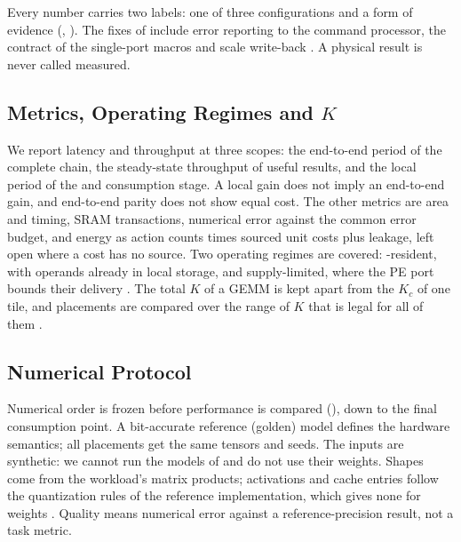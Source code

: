 %
Every number carries two labels: one of three configurations  and a form of evidence (, ).
The fixes of \cfgCorrected include error reporting to the command processor, the contract of the single-port \Lii macros and scale write-back .
A physical result is never called measured.

\subsection{Metrics, Operating Regimes and \texorpdfstring{$K$}{K}}\label{sec:metrics}

%
We report latency and throughput at three scopes: the end-to-end period of the complete chain, the steady-state throughput of useful results, and the local period of the \handoff and consumption stage.
A local gain does not imply an end-to-end gain, and end-to-end parity does not show equal \handoff cost.
The other metrics are area and timing, SRAM transactions, numerical error against the common error budget, and energy as action counts times sourced unit costs plus leakage, left open where a cost has no source.
Two operating regimes are covered: \Lii-resident, with operands already in local storage, and supply-limited, where the PE port bounds their delivery .
The total $K$ of a GEMM is kept apart from the $K_c$ of one tile, and placements are compared over the range of $K$ that is legal for all of them .

\subsection{Numerical Protocol}\label{sec:numerics}

%
Numerical order is frozen before performance is compared (), down to the final consumption point.
A bit-accurate reference (golden) model defines the hardware semantics; all placements get the same tensors and seeds.
The inputs are synthetic: we cannot run the models of  and do not use their weights.
Shapes come from the workload's matrix products; activations and cache entries follow the quantization rules of the reference implementation, which gives none for weights .
Quality means numerical error against a reference-precision result, not a task metric.

